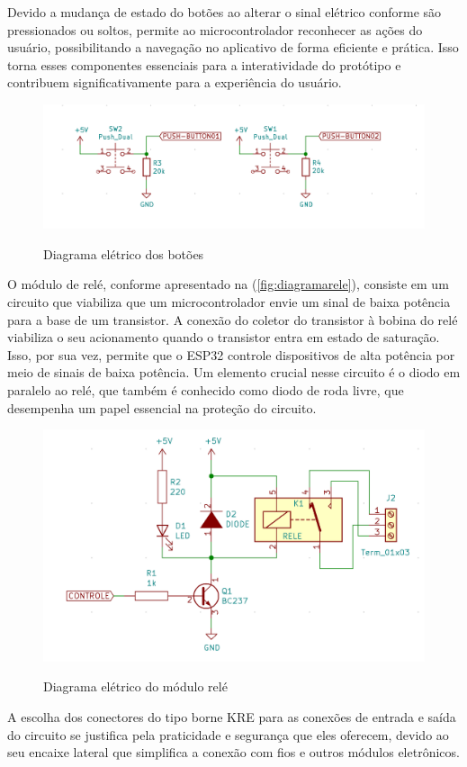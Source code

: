Devido a mudança de estado do botões ao alterar o sinal elétrico conforme 
são pressionados ou soltos, permite ao microcontrolador reconhecer as ações 
do usuário, possibilitando a navegação no aplicativo de forma eficiente 
e prática. Isso torna esses componentes essenciais para a interatividade 
do protótipo e contribuem significativamente para a experiência do usuário.

\begin{figure}[h!]
    \centering
    \caption{Diagrama elétrico dos botões}
    \includegraphics[scale=0.25]{figuras/modulo_push.png}
    \fonte{}%
    \label{fig:diagramabotoes}
    \centering
\end{figure}

O módulo de relé, conforme apresentado na (\autoref{fig:diagramarele}), 
consiste em um circuito que viabiliza que um microcontrolador 
envie um sinal de baixa potência para a base de um transistor. A conexão do 
coletor do transistor à bobina do relé viabiliza o seu acionamento 
quando o transistor entra em estado de saturação. Isso, por sua vez, permite que o ESP32 
controle dispositivos de alta potência por meio de sinais de baixa potência. 
Um elemento crucial nesse circuito é o diodo em paralelo ao relé, 
que também é conhecido como diodo de roda livre, que desempenha um papel 
essencial na proteção do circuito.

\begin{figure}[h!]
    \centering
    \caption{Diagrama elétrico do módulo relé}
    \includegraphics[scale=0.2]{figuras/modulo_rele_esquema.png}
    \fonte{}%
    \label{fig:diagramarele}
    \centering
\end{figure}

A escolha dos conectores do tipo borne KRE para as conexões de entrada 
e saída do circuito se justifica pela praticidade e segurança que 
eles oferecem, devido ao seu encaixe lateral que simplifica a 
conexão com fios e outros módulos eletrônicos.